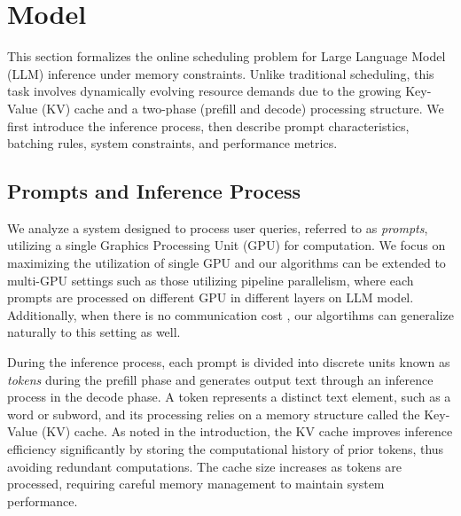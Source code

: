 \section{Model}
\label{sec:model}

This section formalizes the online scheduling problem for Large Language Model (LLM) inference under memory constraints. Unlike traditional scheduling, this task involves dynamically evolving resource demands due to the growing Key-Value (KV) cache and a two-phase (prefill and decode) processing structure. We first introduce the inference process, then describe prompt characteristics, batching rules, system constraints, and performance metrics.

\subsection{Prompts and Inference Process}

We analyze a system designed to process user queries, referred to as \textit{prompts}, utilizing a single Graphics Processing Unit (GPU) for computation. We focus on maximizing the utilization of single GPU and our algorithms can be extended to multi-GPU settings such as those utilizing pipeline parallelism, where each prompts are processed on different GPU in different layers on LLM model. Additionally, when there is no communication cost 
, our algortihms can generalize naturally to this setting as well. 

During the inference process, each prompt is divided into discrete units known as \textit{tokens} during the prefill phase and generates output text through an inference process in the decode phase. A token represents a distinct text element, such as a word or subword, and its processing relies on a memory structure called the Key-Value (KV) cache. As noted in the introduction, the KV cache improves inference efficiency significantly by storing the computational history of prior tokens, thus avoiding redundant computations. The cache size increases as tokens are processed, requiring careful memory management to maintain system performance.



